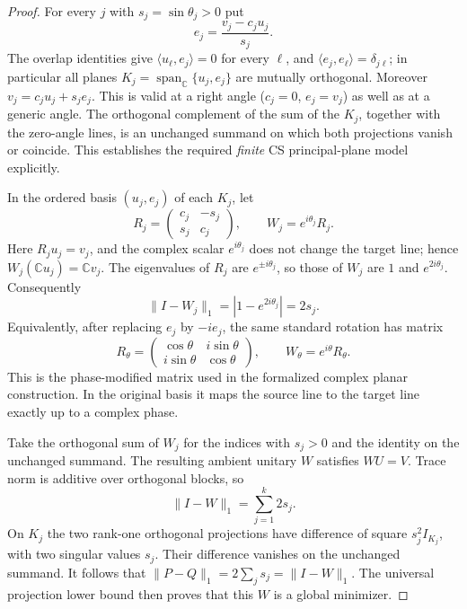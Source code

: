 \begin{tcolorbox}
\begin{proof}
For every $j$ with $s_j=\sin\theta_j>0$ put
\[
 e_j=\frac{v_j-c_j u_j}{s_j}.
\]
The overlap identities give
$\langle u_\ell,e_j\rangle=0$ for every $\ell$,
and $\langle e_j,e_\ell\rangle=\delta_{j\ell}$; in particular all
planes $K_j=\operatorname{span}_{\mathbb C}\{u_j,e_j\}$ are mutually
orthogonal. Moreover $v_j=c_j u_j+s_j e_j$. This is valid at a
right angle ($c_j=0$, $e_j=v_j$) as well as at a generic angle.
The orthogonal complement of the sum of the $K_j$, together with the
zero-angle lines, is an unchanged summand on which both projections
vanish or coincide. This establishes the required \emph{finite} CS
principal-plane model explicitly.

In the ordered basis $(u_j,e_j)$ of each $K_j$, let
\[
 R_j=\begin{pmatrix}c_j&-s_j\\s_j&c_j\end{pmatrix},
 \qquad W_j=e^{i\theta_j}R_j.
\]
Here $R_ju_j=v_j$, and the complex scalar $e^{i\theta_j}$ does not
change the target line; hence $W_j(\mathbb C u_j)=\mathbb C v_j$.
The eigenvalues of $R_j$ are $e^{\pm i\theta_j}$, so those of $W_j$
are $1$ and $e^{2i\theta_j}$. Consequently
\[
 \|I-W_j\|_1=|1-e^{2i\theta_j}|=2s_j.
\]
Equivalently, after replacing $e_j$ by $-ie_j$, the same standard rotation
has matrix
\begin{equation}
 R_\theta=\begin{pmatrix}
   \cos\theta&i\sin\theta\\ i\sin\theta&\cos\theta
 \end{pmatrix},
 \qquad W_\theta=e^{i\theta}R_\theta.
 \label{eq:draft-complex-phase}
\end{equation}
This is the phase-modified matrix used in the formalized complex planar
construction. In the original basis it maps the source line to the target
line exactly up to a complex phase.

Take the orthogonal sum of $W_j$ for the indices with $s_j>0$ and the
identity on the unchanged summand. The resulting ambient unitary $W$
satisfies $WU=V$. Trace norm is additive over orthogonal blocks, so
\[
 \|I-W\|_1=\sum_{j=1}^k2s_j.
\]
On $K_j$ the two rank-one orthogonal projections have difference of
square $s_j^2I_{K_j}$, with two singular values $s_j$. Their difference
vanishes on the unchanged summand. It follows that
$\|P-Q\|_1=2\sum_js_j=\|I-W\|_1$. The universal projection lower bound
then proves that this $W$ is a global minimizer.
\end{proof}


\end{tcolorbox}
